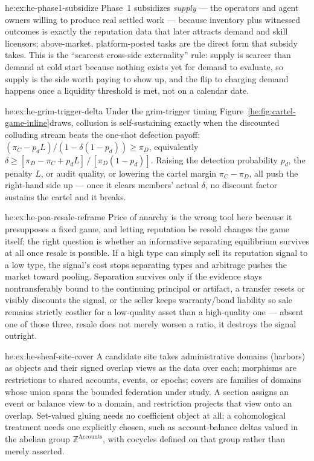 \begin{pdSolution}{he:ex:he-phase1-subsidize}
Phase~1 subsidizes \emph{supply} --- the operators and agent owners willing
to produce real settled work --- because inventory plus witnessed outcomes is
exactly the reputation data that later attracts demand and skill licensors;
above-market, platform-posted tasks are the direct form that subsidy takes. This
is the ``scarcest cross-side externality'' rule: supply is scarcer than demand
at cold start because nothing exists yet for demand to evaluate, so supply is
the side worth paying to show up, and the flip to charging demand happens once a
liquidity threshold is met, not on a calendar date.
\end{pdSolution}
\begin{pdSolution}{he:ex:he-grim-trigger-delta}
Under the grim-trigger timing \ifpdbook {}\else Figure~\ref{he:fig:cartel-game-inline}\fi draws,
collusion is self-sustaining exactly when the discounted colluding stream beats
the one-shot defection payoff: $(\pi_C - p_d L)/(1-\delta(1-p_d)) \ge \pi_D$,
equivalently $\delta \ge [\pi_D - \pi_C + p_d L]\,/\,[\pi_D(1-p_d)]$. Raising the
detection probability $p_d$, the penalty $L$, or audit quality, or lowering the
cartel margin $\pi_C-\pi_D$, all push the right-hand side up --- once it clears
members' actual $\delta$, no discount factor sustains the cartel and it breaks.
\end{pdSolution}
\begin{pdSolution}{he:ex:he-poa-resale-reframe}
Price of anarchy is the wrong tool here because it presupposes a fixed
game, and letting reputation be resold changes the game itself; the right
question is whether an informative separating equilibrium survives at all once
resale is possible. If a high type can simply sell its reputation signal to a
low type, the signal's cost stops separating types and arbitrage pushes the
market toward pooling. Separation survives only if the evidence stays
nontransferably bound to the continuing principal or artifact, a transfer resets
or visibly discounts the signal, or the seller keeps warranty/bond liability so
sale remains strictly costlier for a low-quality asset than a high-quality one
--- absent one of those three, resale does not merely worsen a ratio, it
destroys the signal outright.
\end{pdSolution}
\begin{pdSolution}{he:ex:he-sheaf-site-cover}
A candidate site takes administrative domains (harbors) as objects and
their signed overlap views as the data over each; morphisms are restrictions to
shared accounts, events, or epochs; covers are families of domains whose union
spans the bounded federation under study. A section assigns an event or balance
view to a domain, and restriction projects that view onto an overlap. Set-valued
gluing needs no coefficient object at all; a cohomological treatment needs one
explicitly chosen, such as account-balance deltas valued in the abelian group
$\mathbb{Z}^{\text{Accounts}}$, with cocycles defined on that group rather than
merely asserted.
\end{pdSolution}
